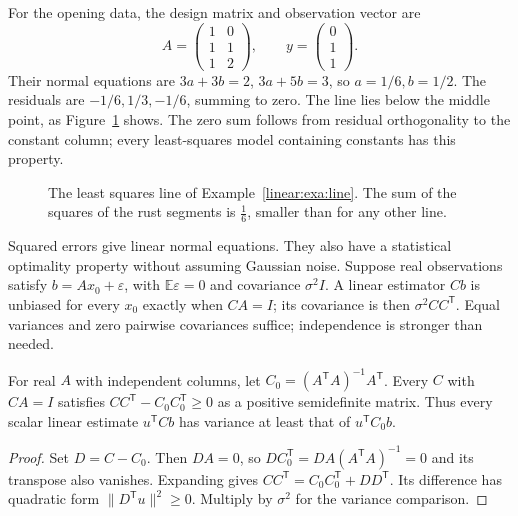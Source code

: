 \begin{example}\label{linear:exa:line}
For the opening data, the design matrix and observation vector are
\[A=\begin{pmatrix}1&0\\1&1\\1&2\end{pmatrix},\qquad y=\begin{pmatrix}0\\1\\1\end{pmatrix}.
\]
Their normal equations are $3a+3b=2$, $3a+5b=3$, so $a=1/6,b=1/2$. The residuals are $-1/6,1/3,-1/6$, summing to zero. The line lies below the middle point, as Figure~\ref{linear:fig:lsq} shows. The zero sum follows from residual orthogonality to the constant column; every least-squares model containing constants has this property.
\end{example}
\begin{figure}[ht]
\centering
{}
\caption{The least squares line of Example~\ref{linear:exa:line}. The sum of the squares of the rust segments is $\frac16$,
smaller than for any other line.}
\label{linear:fig:lsq}
\end{figure}


Squared errors give linear normal equations. They also have a statistical optimality property without assuming Gaussian noise. Suppose real observations satisfy $b=Ax_0+\varepsilon$, with $\mathbb E\varepsilon=0$ and covariance $\sigma^2I$. A linear estimator $Cb$ is unbiased for every $x_0$ exactly when $CA=I$; its covariance is then $\sigma^2CC^{\mathsf T}$. Equal variances and zero pairwise covariances suffice; independence is stronger than needed.

\begin{theorem}\label{linear:thm:gaussmarkov}
For real $A$ with independent columns, let $C_0=(A^{\mathsf T}A)^{-1}A^{\mathsf T}$. Every $C$ with $CA=I$ satisfies $CC^{\mathsf T}-C_0C_0^{\mathsf T}\ge0$ as a positive semidefinite matrix. Thus every scalar linear estimate $u^{\mathsf T}Cb$ has variance at least that of $u^{\mathsf T}C_0b$.
\end{theorem}
\begin{proof}
Set $D=C-C_0$. Then $DA=0$, so $DC_0^{\mathsf T}=DA(A^{\mathsf T}A)^{-1}=0$ and its transpose also vanishes. Expanding gives $CC^{\mathsf T}=C_0C_0^{\mathsf T}+DD^{\mathsf T}$. Its difference has quadratic form $\|D^{\mathsf T}u\|^2\ge0$. Multiply by $\sigma^2$ for the variance comparison.
\end{proof}

